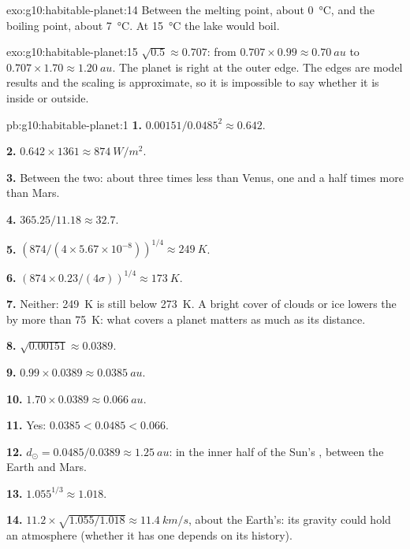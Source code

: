\begin{solution}{exo:g10:habitable-planet:14}
Between the melting point, about \qty{0}{\degreeCelsius}, and the boiling
point, about \qty{7}{\degreeCelsius}. At \qty{15}{\degreeCelsius} the lake
would boil.
\end{solution}

\begin{solution}{exo:g10:habitable-planet:15}
$\sqrt{0.5} \approx 0.707$: from $0.707 \times 0.99 \approx \qty{0.70}{au}$
to $0.707 \times 1.70 \approx \qty{1.20}{au}$. The planet is right at the
outer edge. The edges are model results and the scaling is approximate, so it
is impossible to say whether it is inside or outside.
\end{solution}

\begin{solution}{pb:g10:habitable-planet:1}
\textbf{1.} $0.00151/0.0485^2 \approx 0.642$.

\textbf{2.} $0.642 \times 1361 \approx \qty{874}{W/m^2}$.

\textbf{3.} Between the two: about three times less than Venus, one and a
half times more than Mars.

\textbf{4.} $365.25/11.18 \approx 32.7$.

\textbf{5.} $(874/(4 \times 5.67\times10^{-8}))^{1/4} \approx \qty{249}{K}$.

\textbf{6.} $(874 \times 0.23/(4\sigma))^{1/4} \approx \qty{173}{K}$.

\textbf{7.} Neither: \qty{249}{K} is still below \qty{273}{K}. A bright cover
of clouds or ice lowers the  by more than
\qty{75}{K}: what covers a planet matters as much as its distance.

\textbf{8.} $\sqrt{0.00151} \approx 0.0389$.

\textbf{9.} $0.99 \times 0.0389 \approx \qty{0.0385}{au}$.

\textbf{10.} $1.70 \times 0.0389 \approx \qty{0.066}{au}$.

\textbf{11.} Yes: $0.0385 < 0.0485 < 0.066$.

\textbf{12.} $d_\odot = 0.0485/0.0389 \approx \qty{1.25}{au}$: in the inner
half of the Sun's , between the Earth and Mars.

\textbf{13.} $1.055^{1/3} \approx 1.018$.

\textbf{14.} $11.2 \times \sqrt{1.055/1.018} \approx \qty{11.4}{km/s}$, about the
Earth's: its gravity could hold an atmosphere (whether it has one depends on
its history).


\end{solution}
